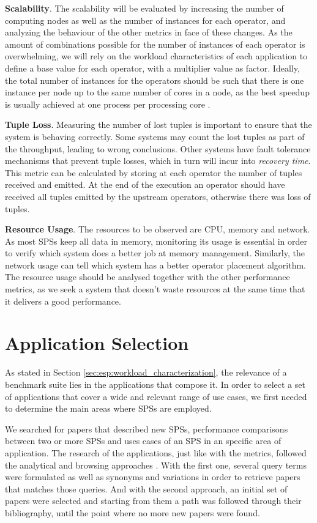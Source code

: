 \documentclass[ppgc,diss,english]{iiufrgs}
\begin{document}
\textbf{Scalability}. The scalability will be evaluated by increasing the number of computing nodes as well as the number of instances for each operator, and analyzing the behaviour of the other metrics in face of these changes. As the amount of combinations possible for the number of instances of each operator is overwhelming, we will rely on the workload characteristics of each application to define a base value for each operator, with a multiplier value as factor. Ideally, the total number of instances for the operators should be such that there is one instance per node up to the same number of cores in a node, as the best speedup is usually achieved at one process per processing core \cite{ravi2009performance, chai2007understanding}.

\textbf{Tuple Loss}. Measuring the number of lost tuples is important to ensure that the system is behaving correctly. Some systems may count the lost tuples as part of the throughput, leading to wrong conclusions. Other systems have fault tolerance mechanisms that prevent tuple losses, which in turn will incur into \emph{recovery time}. This metric can be calculated by storing at each operator the number of tuples received and emitted. At the end of the execution an operator should have received all tuples emitted by the upstream operators, otherwise there was loss of tuples.

\textbf{Resource Usage}. The resources to be observed are CPU, memory and network. As most SPSs keep all data in memory, monitoring its usage is essential in order to verify which system does a better job at memory management. Similarly, the network usage can tell which system has a better operator placement algorithm. The resource usage should be analysed together with the other performance metrics, as we seek a system that doesn't waste resources at the same time that it delivers a good performance.

\section{Application Selection}
\label{sec:application-selection}

As stated in Section \ref{sec:esp:workload_characterization}, the relevance of a benchmark suite lies in the applications that compose it. In order to select a set of applications that cover a wide and relevant range of use cases, we first needed to determine the main areas where SPSs are employed.

We searched for papers that described new SPSs, performance comparisons between two or more SPSs and uses cases of an SPS in an specific area of application. The research of the applications, just like with the metrics, followed the analytical and browsing approaches \cite{best2014systematically}. With the first one, several query terms were formulated as well as synonyms and variations in order to retrieve papers that matches those queries. And with the second approach, an initial set of papers were selected and starting from them a path was followed through their bibliography, until the point where no more new papers were found.
\end{document}
